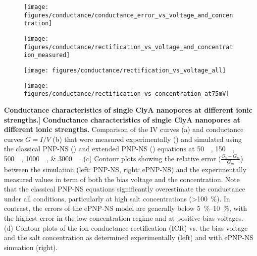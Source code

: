 \begin{figure*}[htbp]
\begin{minipage}[t]{12cm}
\begin{minipage}{12cm}
\begin{subfigure}[t]{7cm}
        \caption{}\vspace{-3mm}\label{fig:conductance_error_contour}
        \texttt{[image: figures/conductance/conductance\_error\_vs\_voltage\_and\_concentration]}
      \end{subfigure}
    \end{minipage}
    \begin{minipage}{12cm}
      \begin{subfigure}[t]{4cm}
        \centering
        \caption{}\vspace{-3mm}\label{fig:rectification_contour}
        \texttt{[image: figures/conductance/rectification\_vs\_voltage\_and\_concentration\_measured]}
      \end{subfigure}
      \begin{subfigure}[t]{3.5cm}
        \centering
        \caption{}\vspace{-3mm}\label{fig:rectification_vs_voltage}
        \texttt{[image: figures/conductance/rectification\_vs\_voltage\_all]}
      \end{subfigure}
      \begin{subfigure}[t]{4cm}
        \centering
        \caption{}\vspace{-3mm}\label{fig:rectification_vs_concentration}
        \texttt{[image: figures/conductance/rectification\_vs\_concentration\_at75mV]}
      \end{subfigure}
    \end{minipage}
  \end{minipage}
	
	\caption
	[\textbf{Conductance characteristics of single ClyA nanopores at different ionic strengths.}]
	{
		\textbf{Conductance characteristics of single ClyA nanopores at different ionic strengths.}
		Comparison of the IV curves (a) and conductance curves $G = I/V$ (b) that were measured 
		experimentally () and simulated using the classical PNP-NS 
		() and extended PNP-NS () equations  at 
		\SIlist[list-units=single]{50;150;500;1000;3000}{\milli\Molar}.
		(c) Contour plots showing the relative error ($\displaystyle\frac{G_\text{s}-G_\text{m}}{G_{m}}$) 
		between the simulation (left: PNP-NS, right: ePNP-NS) and the experimentally measured values in term 
		of both the bias voltage and the concentration.
		Note that the classical PNP-NS equations significantly overestimate the conductance under all 
		conditions, particularly at high salt concentrations (\SI{>100}{\percent}).
		In contrast, the errors of the ePNP-NS model are generally below \SIrange{5}{10}{\percent}, with the 
		highest error in the low concentration regime and at positive bias voltages.
		(d) Contour plots of the ion conductance rectification (ICR) vs. the bias voltage and the salt 
		concentration as determined experimentally (left) and with ePNP-NS simuation (right).
	}


\end{figure*}
